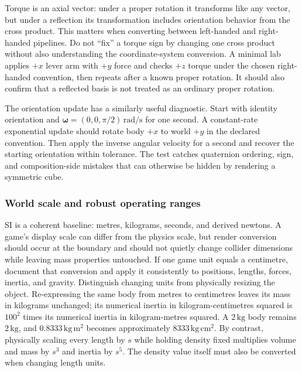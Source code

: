 Torque is an axial vector: under a proper rotation it transforms like any vector, but under a reflection its transformation includes orientation behavior from the cross product. This matters when converting between left-handed and right-handed pipelines. Do not ``fix'' a torque sign by changing one cross product without also understanding the coordinate-system conversion. A minimal lab applies \(+x\) lever arm with \(+y\) force and checks \(+z\) torque under the chosen right-handed convention, then repeats after a known proper rotation. It should also confirm that a reflected basis is not treated as an ordinary proper rotation.

The orientation update has a similarly useful diagnostic. Start with identity orientation and \(\boldsymbol\omega=(0,0,\pi/2)\,\mathrm{rad/s}\) for one second. A constant-rate exponential update should rotate body \(+x\) to world \(+y\) in the declared convention. Then apply the inverse angular velocity for a second and recover the starting orientation within tolerance. The test catches quaternion ordering, sign, and composition-side mistakes that can otherwise be hidden by rendering a symmetric cube.

\subsubsection{World scale and robust operating ranges}\label{06-engine-ii-ch034-world-scale-and-robust-operating-ranges}

\hypertarget{06-engine-ii-ch034-world-scale-and-robust-operating-ranges}{}

SI is a coherent baseline: metres, kilograms, seconds, and derived newtons. A game's display scale can differ from the physics scale, but render conversion should occur at the boundary and should not quietly change collider dimensions while leaving mass properties untouched. If one game unit equals a centimetre, document that conversion and apply it consistently to positions, lengths, forces, inertia, and gravity. Distinguish changing units from physically resizing the object. Re-expressing the same body from metres to centimetres leaves its mass in kilograms unchanged; its numerical inertia in kilogram-centimetres squared is \(100^2\) times its numerical inertia in kilogram-metres squared. A \(2\,\mathrm{kg}\) body remains \(2\,\mathrm{kg}\), and \(0.8333\,\mathrm{kg\,m^2}\) becomes approximately \(8333\,\mathrm{kg\,cm^2}\). By contrast, physically scaling every length by \(s\) while holding density fixed multiplies volume and mass by \(s^3\) and inertia by \(s^5\). The density value itself must also be converted when changing length units.

